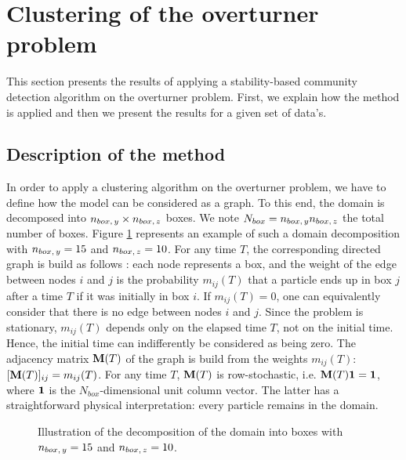 \section{Clustering of the overturner problem}

This section presents the results of applying a stability-based community detection algorithm on the overturner problem. First, we explain how the method is applied and then we present the results for a given set of data's.

\subsection{Description of the method}
In order to apply a clustering algorithm on the overturner problem, we have to define how the model can be considered as a graph. To this end, the domain is decomposed into $n_{box,\,y} \times n_{box,\,z}$ boxes. We note $N_{box} = n_{box,\,y}n_{box,\,z}$ the total number of boxes. Figure \ref{fig:box_scheme} represents an example of such a domain decomposition with $n_{box,\,y} = 15$ and $n_{box,\,z} = 10$. For any time $T$, the corresponding directed graph is build as follows : each node represents a box, and the weight of the edge between nodes $i$ and $j$ is the probability $m_{ij}(T)$ that a particle ends up in box $j$ after a time $T$ if it was initially in box $i$. If $m_{ij}(T) = 0$, one can equivalently consider that there is no edge between nodes $i$ and $j$. Since the problem is stationary, $m_{ij}(T)$ depends only on the elapsed time $T$, not on the initial time. Hence, the initial time can indifferently be considered as being zero. The adjacency matrix $\mathbf M(T)$ of the graph is build from the weights $m_{ij}(T)$: $[\mathbf M(T)]_{ij} = m_{ij}(T)$. For any time $T$, $\mathbf M(T)$ is row-stochastic, i.e. $\mathbf M(T)\mathbf 1 = \mathbf 1$, where $\mathbf 1$ is the $N_{box}$-dimensional unit column vector. The latter has a straightforward physical interpretation: every particle remains in the domain.
\begin{figure}[h!]
	\centering
	
	\caption{Illustration of the decomposition of the domain into boxes with $n_{box,\,y} = 15$ and $n_{box,\,z} = 10$.}
	\label{fig:box_scheme}
\end{figure}

